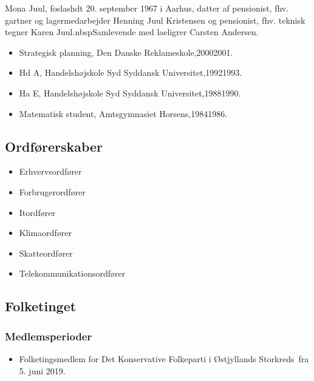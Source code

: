 \documentclass[11pt, a4paper]{awesome-cv}
\begin{document}
\makecvheader[R]
\makelettertitle
\begin{cvletter}
Mona Juul, foslashdt 20. september 1967 i Aarhus, datter af pensionist, fhv. gartner og lagermedarbejder Henning Juul Kristensen og pensionist, fhv. teknisk tegner Karen Juul.nbspSamlevende med laeligrer Carsten Andersen.

\begin{itemize}
\item Strategisk planning, Den Danske Reklameskole,20002001.
\item Hd A, Handelshøjskole Syd Syddansk Universitet,19921993.
\item Ha E, Handelshøjskole Syd Syddansk Universitet,19881990.
\item Matematisk student, Amtsgymnasiet Horsens,19841986.
\end{itemize}
\subsection*{Ordførerskaber}
\begin{itemize}
\item Erhvervsordfører
\item Forbrugerordfører
\item Itordfører
\item Klimaordfører
\item Skatteordfører
\item Telekommunikationsordfører
\end{itemize}
\subsection*{Folketinget}
\subsubsection*{Medlemsperioder}
\begin{itemize}
\item Folketingsmedlem for Det Konservative Folkeparti i Østjyllands Storkreds fra 5. juni 2019.
\end{itemize}

\end{cvletter}
\end{document}
